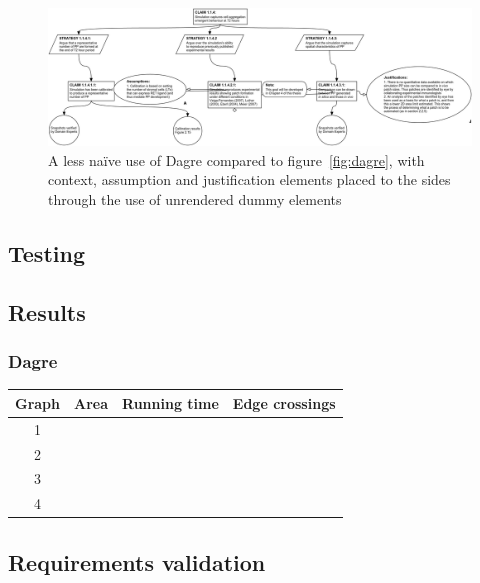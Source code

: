 \begin{figure}
  \centering
  \includegraphics[width=\textwidth]{graphics/results/dagre-enhanced.png}
  \caption{A less na\"ive use of Dagre compared to figure~\ref{fig:dagre}, with context, assumption and justification elements placed to the sides through the use of unrendered dummy elements}
  \label{fig:dagre2}
\end{figure}



\begin{landscape}

\section{Testing}



\subsection{Results}

\subsubsection{Dagre}

\begin{tabular}{ | c | c | c | c | }
    \hline
    Graph & Area & Running time & Edge crossings \\
    \hline
    1     & & & \\
    \hline
    2     & & & \\
    \hline
    3     & & & \\
    \hline
    4     & & & \\
    \hline
\end{tabular}



\end{landscape}


\subsection{Requirements validation}


